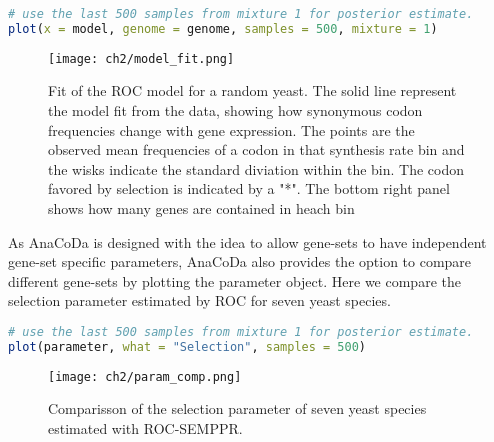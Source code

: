 \begin{lstlisting}[language=R]
# use the last 500 samples from mixture 1 for posterior estimate.
plot(x = model, genome = genome, samples = 500, mixture = 1)
\end{lstlisting}

\begin{figure}[h]
  \centering
  \texttt{[image: ch2/model\_fit.png]}\\
  \caption{Fit of the ROC model for a random yeast. The solid line represent the model fit from the data,
showing how synonymous codon frequencies change with gene expression. The points are the observed mean
frequencies of a codon in that synthesis rate bin and the wisks indicate the standard diviation within the bin.
The codon favored by selection is indicated by a "*". The bottom right panel shows how many genes are
contained in heach bin}
  \label{fig:cub_dummy}
\end{figure} 

As AnaCoDa is designed with the idea to allow gene-sets to have independent gene-set specific parameters, AnaCoDa also provides the option to compare different gene-sets by plotting the parameter object. 
Here we compare the selection parameter estimated by ROC for seven yeast species.

\begin{lstlisting}[language=R]
# use the last 500 samples from mixture 1 for posterior estimate.
plot(parameter, what = "Selection", samples = 500)
\end{lstlisting}



\begin{figure}[h]
  \centering
  \texttt{[image: ch2/param\_comp.png]}\\
  \caption{Comparisson of the selection parameter of seven yeast species estimated with ROC-SEMPPR.}
  \label{fig:comp_dummy}
\end{figure} 
